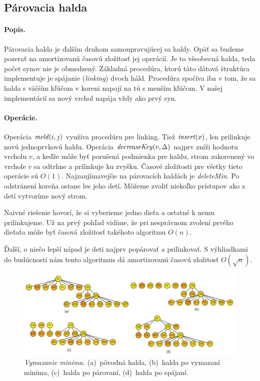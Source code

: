 \subsection{Párovacia halda} 
\paragraph{Popis.}
Párovacia halda je ďalším druhom samoupravujúcej sa haldy. Opäť sa budeme pozerať na amortizovanú časovú zložitosť jej operácií.
Je to všeobecná halda, teda počet synov nie je obmedzený.
Základná procedúra, ktorú táto dátová štruktúra implementuje je spájanie (\emph{linking}) dvoch háld. Procedúra spočíva iba v tom, že sa halda s väčśím kľúčom v koreni napojí na tú s menším kľúčom. V našej implementácií sa nový vrchol napája vždy ako prvý syn.

\paragraph{Operácie.}
Operácia $\mathop{\mathit{meld}}(i,j)$ využíva procedúru pre linking. Tiež $\mathop{\mathit{insert}}(x)$, len prilinkuje novú jednoprvkovú haldu.
Operácia $\mathop{\mathit{decreaseKey}}(v, \Delta)$ najprv zníži hodnotu vrcholu $v$, a keďže môže byť porušená podmienka pre haldu,
strom zakorenený vo vrchole $v$ sa odtrhne a prilinkuje ku zvyšku. Časové zložitosti pre všetky tieto operácie
sú $O(1)$. Najzaujímavejšie na párovacích haldách je \emph{deleteMin}. Po odstránení koreňa ostane les jeho detí.
Môžeme zvoliť niekoľko prístupov ako z detí vytvoríme nový strom.

Naivné riešenie hovorí, že si vyberieme jedno dieťa a ostatné k nemu prilinkujeme. Už na prvý pohľad vidíme,
že pri nesprávnom zvolení prvého dieťaťa môže byť časová zložitosť takéhoto algoritmu $O(n)$.

Ďalší, o niečo lepší nápad je deti najprv popárovať a prilinkovať. S výhliadkami do budúcnosti nám tento algoritmus dá 
amortizovanú časovú zložitosť $O(\sqrt{n})$.

\begin{figure}
\includegraphics[width=\columnwidth]{obrazky/pairdel.png}
\caption{\emph{Vymazanie minima.} 
(a)~pôvodná halda, (b)~halda po vymazaní minima, (c)~halda po párovaní, (d)~halda po spájaní.} 
\label{img:pairdel} 
\end{figure}

